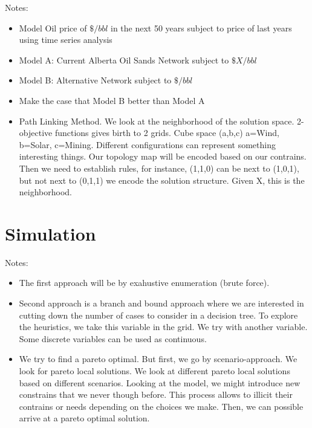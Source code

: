 \documentclass[12pt]{article}
\begin{document}
Notes:
\begin{itemize}
\item Model Oil price of $\$/bbl$ in the next 50 years subject to price of last years using time series analysis
\item Model A: Current Alberta Oil Sands Network subject to $\$X/bbl$
\item Model B: Alternative Network subject to $\$/bbl$
\item Make the case that Model B better than Model A
\item Path Linking Method. We look at the neighborhood of the solution space. 2-objective functions gives birth to 2 grids. Cube space (a,b,c) a=Wind, b=Solar, c=Mining. Different configurations can represent something interesting things. Our topology map will be encoded based on our contrains. Then we need to establish rules, for instance, (1,1,0) can be next to (1,0,1), but not next to (0,1,1) we encode the solution structure. Given X, this is the neighborhood.  
\end{itemize}

\section{Simulation}
Notes:
\begin{itemize}
\item The first approach will be by exahustive enumeration (brute force). 
\item Second approach is a branch and bound approach where we are interested in cutting down the number of cases to consider in a decision tree. To explore the heuristics, we take this variable in the grid. We try with another variable. Some discrete variables can be used as continuous. 
\item We try to find a pareto optimal. But first, we go by scenario-approach. We look for pareto local solutions. We look at different pareto local solutions based on different scenarios. Looking at the model, we might introduce new constrains that we never though before. This process allows to illicit their contrains or needs depending on the choices we make. Then, we can possible arrive at a pareto optimal solution. 
\end{itemize}
\end{document}
